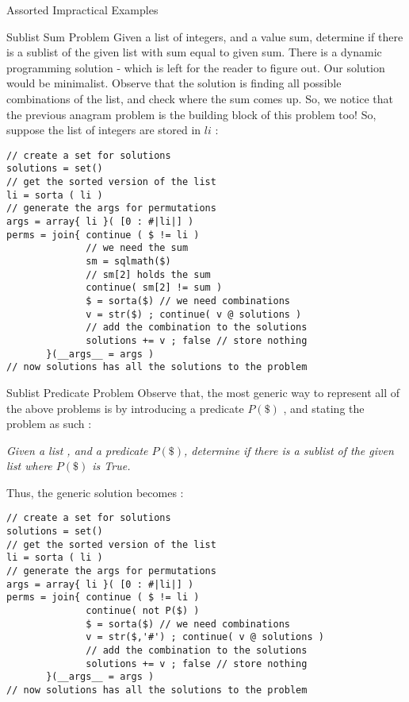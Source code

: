 \begin{section}{Assorted Impractical Examples}
\begin{subsection}{Sublist Sum Problem}
Given a list of integers, and a value sum, determine if there is a sublist of the given list with sum equal to given sum.
There is a dynamic programming solution - which is left for the reader to figure out. 
Our solution would be minimalist. Observe that the solution is finding all possible combinations of the list, 
and check where the sum comes up. So, we notice that the previous anagram problem is the building block of this problem too!
So, suppose the list of integers are stored in $li$ :
\begin{center}\begin{minipage}{\linewidth}
\begin{lstlisting}[style=JexlStyle]
// create a set for solutions 
solutions = set()
// get the sorted version of the list 
li = sorta ( li )
// generate the args for permutations 
args = array{ li }( [0 : #|li|] )
perms = join{ continue ( $ != li )
              // we need the sum 
              sm = sqlmath($)
              // sm[2] holds the sum 
              continue( sm[2] != sum ) 
              $ = sorta($) // we need combinations 
              v = str($) ; continue( v @ solutions )
              // add the combination to the solutions
              solutions += v ; false // store nothing
       }(__args__ = args )
// now solutions has all the solutions to the problem 
\end{lstlisting}  
\end{minipage}\end{center}
\end{subsection}

\begin{subsection}{Sublist Predicate Problem}
Observe that, the most generic way to represent all of the above problems is by introducing 
a predicate $P(\$)$ , and stating the problem as such :
\begin{center}\emph{
Given a list , and a predicate $P(\$)$, determine if there is a sublist of the given list where $P(\$)$ is True.
}
\end{center}
Thus, the generic solution becomes :
\begin{center}\begin{minipage}{\linewidth}
\begin{lstlisting}[style=JexlStyle]
// create a set for solutions 
solutions = set()
// get the sorted version of the list 
li = sorta ( li )
// generate the args for permutations 
args = array{ li }( [0 : #|li|] )
perms = join{ continue ( $ != li )
              continue( not P($) ) 
              $ = sorta($) // we need combinations 
              v = str($,'#') ; continue( v @ solutions )
              // add the combination to the solutions
              solutions += v ; false // store nothing
       }(__args__ = args )
// now solutions has all the solutions to the problem 
\end{lstlisting}  
\end{minipage}\end{center}


\end{subsection}
\end{section}
